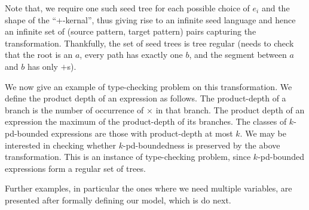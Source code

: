 Note that, we require one such seed tree for each possible choice of $e_i$ and the shape of the ``+-kernal'', thus giving rise to an infinite seed language and hence an infinite set of (source pattern, target pattern) pairs capturing the transformation. Thankfully, the set of seed trees is tree regular (needs to check that the root is an $a$, every path has exactly one $b$, and the segment between $a$ and $b$ has only $+$s).

\medskip

We now give an example of type-checking problem on this transformation. We define the product depth of an expression as follows. The product-depth of a branch is the number of occurrence of $\times$ in that branch. The product depth of an expression the maximum of the product-depth of its branches. The classes of $k$-pd-bounded expressions are those with product-depth at most $k$. We  may be interested in checking whether $k$-pd-boundedness is preserved by the above transformation. This is an instance of  type-checking problem, since $k$-pd-bounded expressions form a regular set of trees.

Further examples, in particular the ones where we need multiple variables, are presented after formally defining our model, which is do next.
